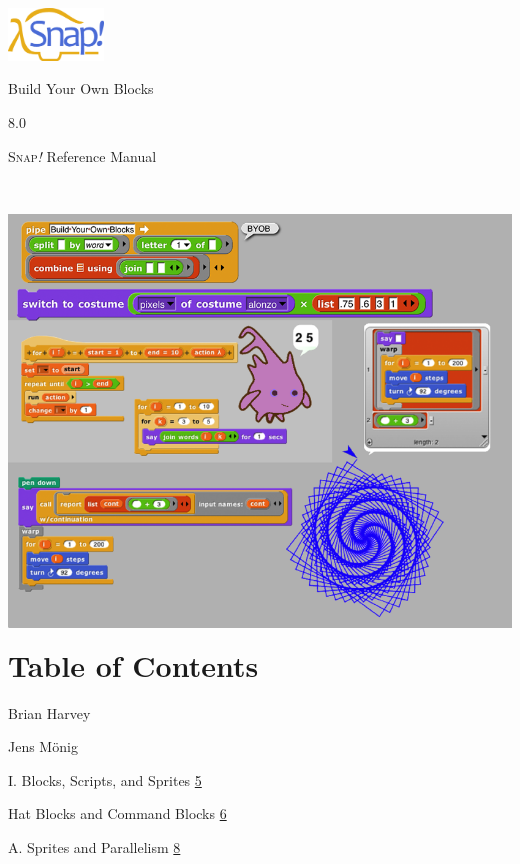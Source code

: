 \includegraphics[width=1in,height=0.54926in]{media/image2.png}

Build Your Own Blocks

8.0

\textsc{Snap\emph{!}} Reference Manual

\section{}\label{section}

\section[\hfill\break
Table of
Contents]{\texorpdfstring{\protect\includegraphics[width=5.47778in,height=4.50139in]{media/image3.png}\\
Table of Contents}{ Table of Contents}}\label{table-of-contents}

Brian Harvey

Jens Mönig

I. Blocks, Scripts, and Sprites \hyperref[blocks-scripts-and-sprites]{5}

Hat Blocks and Command Blocks
\hyperref[hat-blocks-and-command-blocks]{6}

A. Sprites and Parallelism \hyperref[sprites-and-parallelism]{8}

